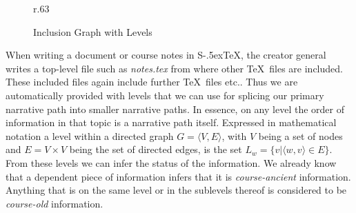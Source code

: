 \documentclass{llncs}
\def\stex{\texorpdfstring{\raisebox{-.5ex}S\kern-.5ex\TeX}{sTeX}\xspace}
\begin{document}
\begin{figure}r{.63\textwidth}\vspace{-2em}
  \vspace{-0.8em}
  \caption{Inclusion Graph with Levels}\label{fig:levelsGraph}
\vspace{-2em}
\end{figure}
When writing a document or course notes in \stex, the creator general writes a top-level
file such as \textit{notes.tex} from where other \TeX\ files are included. These included
files again include further \TeX\ files etc.. Thus we are automatically provided with
levels that we can use for splicing our primary narrative path into smaller narrative
paths. In essence, on any level the order of information in that topic is a narrative path
itself. Expressed in mathematical notation a level within a directed graph
$G = \langle V, E \rangle $, with $V$ being a set of nodes and $E = V \times V$ being the
set of directed edges, is the set
$L_w = \lbrace v \vert \langle w, v \rangle \in E \rbrace$. From these levels we can infer
the status of the information. We already know that a dependent piece of information
infers that it is \textit{course-ancient} information. Anything that is on the same level
or in the sublevels thereof is considered to be \textit{course-old} information.
\end{document}
